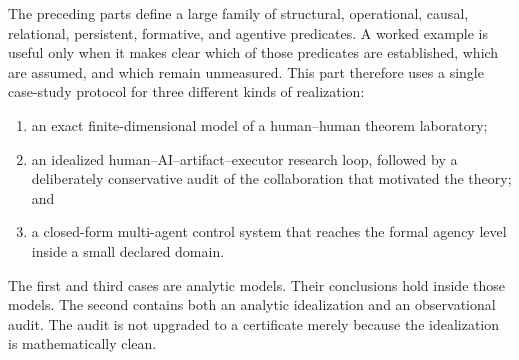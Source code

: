 

The preceding parts define a large family of structural, operational, causal,
relational, persistent, formative, and agentive predicates. A worked example
is useful only when it makes clear which of those predicates are established,
which are assumed, and which remain unmeasured. This part therefore uses a
single case-study protocol for three different kinds of realization:
\begin{enumerate}
\item an exact finite-dimensional model of a human--human theorem laboratory;
\item an idealized human--AI--artifact--executor research loop, followed by a
 deliberately conservative audit of the collaboration that motivated the
 theory; and
\item a closed-form multi-agent control system that reaches the formal agency
 level inside a small declared domain.
\end{enumerate}
The first and third cases are analytic models. Their conclusions hold inside
those models. The second contains both an analytic idealization and an
observational audit. The audit is not upgraded to a certificate merely because
the idealization is mathematically clean.

